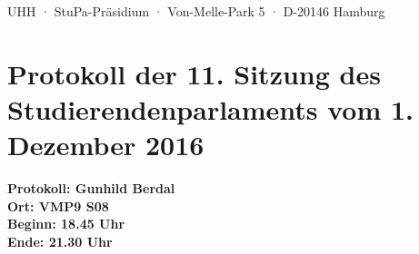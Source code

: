 \documentclass[ngerman,headheight=70pt]{scrartcl}
\begin{document}
    UHH · StuPa-Präsidium · Von-Melle-Park 5 · D-20146 Hamburg

    \section*{Protokoll der 11. Sitzung des Studierendenparlaments vom 1. Dezember 2016}

    \textbf{Protokoll: Gunhild Berdal}\\
    \textbf{Ort: VMP9 S08}\\
    \textbf{Beginn: 18.45 Uhr}\\
    \textbf{Ende: 21.30 Uhr}

    \vspace{0.5cm}
\end{document}
